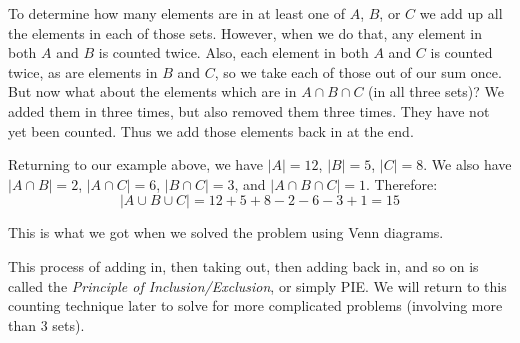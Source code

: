 \documentclass[10pt,]{book}
\theoremstyle{plain}
\theoremstyle{definition}
\theoremstyle{definition}
\theoremstyle{definition}
\numberwithin{equation}{chapter}
\newcommand{\card}[1]{\left| #1 \right|}
\begin{document}
      To determine how many elements are in at least one of \(A\), \(B\), or \(C\) we add up all the elements in each of those sets. However, when we do that, any element in both \(A\) and \(B\) is counted twice. Also, each element in both \(A\) and \(C\) is counted twice, as are elements in \(B\) and \(C\), so we take each of those out of our sum once. But now what about the elements which are in \(A \cap B \cap C\) (in all three sets)? We added them in three times, but also removed them three times. They have not yet been counted. Thus we add those elements back in at the end.
\par

      Returning to our example above, we have \(\card{A} = 12\), \(\card{B} = 5\), \(\card{C} = 8\). We also have \(\card{A \cap B} = 2\), \(\card{A \cap C} = 6\), \(\card{B \cap C} = 3\), and \(\card{A \cap B \cap C} = 1\). Therefore:
      \begin{equation*}
        \card{A \cup B \cup C} = 12 + 5 + 8 - 2 - 6 - 3 + 1 = 15
      \end{equation*}
\par

      This is what we got when we solved the problem using Venn diagrams.
\par

      This process of adding in, then taking out, then adding back in, and so on is called the \emph{Principle of Inclusion/Exclusion}, or simply PIE. We will return to this counting technique later to solve for more complicated problems (involving more than 3 sets).
\typeout{************************************************}
\typeout{************************************************}
\end{document}
